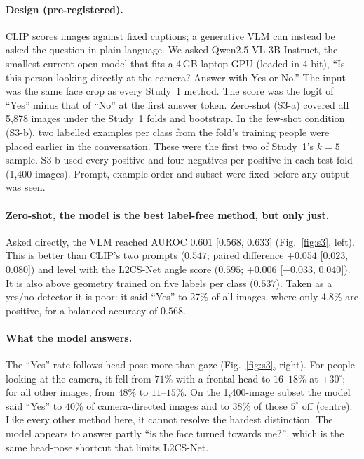 \documentclass[10pt,twocolumn]{article}
\begin{document}
\paragraph{Design (pre-registered).}
CLIP scores images against fixed captions; a generative VLM can instead be asked the question in plain language. We
asked Qwen2.5-VL-3B-Instruct, the smallest current open model that fits a 4\,GB laptop GPU (loaded in 4-bit), ``Is
this person looking directly at the camera? Answer with Yes or No.'' The input was the same face crop as every
Study~1 method. The score was the logit of ``Yes'' minus that of ``No'' at the first answer token. Zero-shot (S3-a)
covered all 5{,}878 images under the Study~1 folds and bootstrap. In the few-shot condition (S3-b), two labelled
examples per class from the fold's training people were placed earlier in the conversation. These were the first two
of Study~1's $k{=}5$ sample. S3-b used every positive and four negatives per positive in each test fold
(1{,}400 images). Prompt, example order and subset were fixed before any output was seen.

\paragraph{Zero-shot, the model is the best label-free method, but only just.}
Asked directly, the VLM reached AUROC $0.601$ [$0.568$, $0.633$] (Fig.~\ref{fig:s3}, left). This is better than
CLIP's two prompts ($0.547$; paired difference $+0.054$ [$0.023$, $0.080$]) and level with the L2CS-Net angle score
($0.595$; $+0.006$ [$-0.033$, $0.040$]). It is also above geometry trained on five labels per class ($0.537$).
Taken as a yes/no detector it is poor: it said ``Yes'' to 27\% of all images, where only 4.8\% are positive, for a
balanced accuracy of $0.568$.

\paragraph{What the model answers.}
The ``Yes'' rate follows head pose more than gaze (Fig.~\ref{fig:s3}, right). For people looking at the camera, it
fell from $71\%$ with a frontal head to $16$--$18\%$ at $\pm30^\circ$; for all other images, from $48\%$ to
$11$--$15\%$. On the 1{,}400-image subset the model said ``Yes'' to $40\%$ of camera-directed images and to $38\%$ of
those $5^\circ$ off (centre). Like every other method here, it cannot resolve the hardest distinction. The model
appears to answer partly ``is the face turned towards me?'', which is the same head-pose shortcut that limits
L2CS-Net.
\end{document}
